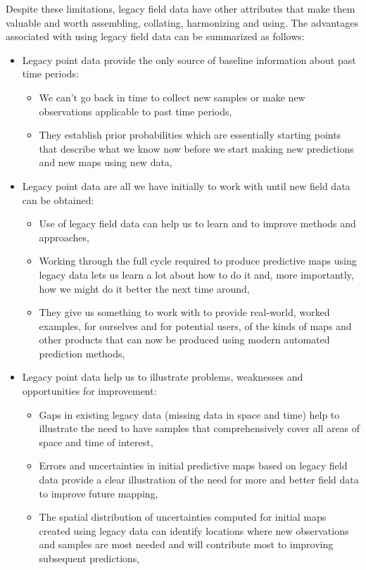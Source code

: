 \documentclass[graybox,natbib,nospthms,UStrade]{svmono}
\begin{document}
Despite these limitations, legacy field data have other attributes that
make them valuable and worth assembling, collating, harmonizing and using.
The advantages associated with using legacy field data can be summarized
as follows:

\begin{itemize}
\item
  Legacy point data provide the only source of baseline information
  about past time periods:

  \begin{itemize}
  \item
    We can't go back in time to collect new samples or make new
    observations applicable to past time periods,
  \item
    They establish prior probabilities which are essentially
    starting points that describe what we know now before we start
    making new predictions and new maps using new data,
  \end{itemize}
\item
  Legacy point data are all we have initially to work with until new
  field data can be obtained:

  \begin{itemize}
  \item
    Use of legacy field data can help us to learn and to improve
    methods and approaches,
  \item
    Working through the full cycle required to produce predictive
    maps using legacy data lets us learn a lot about how to do it and, more
    importantly, how we might do it better the next time around,
  \item
    They give us something to work with to provide real-world,
    worked examples, for ourselves and for potential users, of the
    kinds of maps and other products that can now be produced
    using modern automated prediction methods,
  \end{itemize}
\item
  Legacy point data help us to illustrate problems, weaknesses and
  opportunities for improvement:

  \begin{itemize}
  \item
    Gaps in existing legacy data (missing data in space and time)
    help to illustrate the need to have samples that
    comprehensively cover all areas of space and time of interest,
  \item
    Errors and uncertainties in initial predictive maps based on
    legacy field data provide a clear illustration of the need for
    more and better field data to improve future mapping,
  \item
    The spatial distribution of uncertainties computed for initial
    maps created using legacy data can identify locations where
    new observations and samples are most needed and will
    contribute most to improving subsequent predictions,
  \end{itemize}
\end{itemize}
\end{document}
